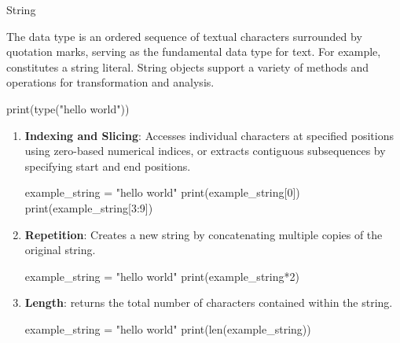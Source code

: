 \documentclass[10pt]{article}
\begin{document}
      \begin{core}[label=core:string]{String}

        The  data type is an ordered sequence of textual characters surrounded by quotation marks, serving as the fundamental data type for text. For example,  constitutes a string literal. String objects support a variety of methods and operations for transformation and analysis.

        \begin{pyconsole}

          print(type("hello world"))

        \end{pyconsole}

        \begin{enumerate}

          \item \textbf{Indexing and Slicing}: Accesses individual characters at specified positions using zero-based numerical indices, or extracts contiguous subsequences by specifying start and end positions.

          \begin{pyconsole}

            example_string = "hello world"
            print(example_string[0])
            print(example_string[3:9])

          \end{pyconsole}

          \item \textbf{Repetition}: Creates a new string by concatenating multiple copies of the original string.

          \begin{pyconsole}

            example_string = "hello world"
            print(example_string*2)

          \end{pyconsole}

          \item \textbf{Length}:  returns the total number of characters contained within the string.

          \begin{pyconsole}

            example_string = "hello world"
            print(len(example_string))


\end{pyconsole}
\end{enumerate}
\end{core}
\end{document}
